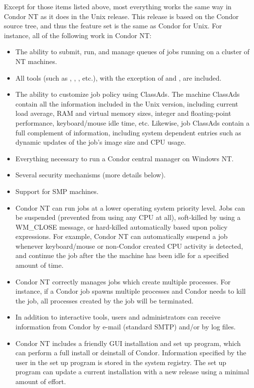 Except for those items listed above, most everything works
the same way in Condor NT as it does in the Unix release.
This release is based on the Condor \VersionNotice source tree, and thus the
feature set is the same as Condor \VersionNotice for Unix.  
For instance, all of the following work in Condor NT:
\begin{itemize}

\item The ability to submit, run, and manage queues of jobs running on a
cluster of NT machines.

\item All tools (such as , , ,
etc.), with the exception of  and , are 
included.

\item The ability to customize job policy using ClassAds.  The machine
ClassAds contain all the information included in the Unix version,
including current load average, RAM and virtual memory sizes, integer and
floating-point performance, keyboard/mouse idle time, etc.  Likewise, job
ClassAds contain a full complement of information, including system
dependent entries such as dynamic updates of the job's image size and CPU
usage.

\item Everything necessary to run a Condor central manager on Windows NT.

\item Several security mechanisms (more details below).

\item Support for SMP machines.

\item Condor NT can run jobs at a lower operating system priority level.
Jobs can be suspended (prevented from using any CPU at all), soft-killed 
by using 
a WM\_CLOSE message, or hard-killed automatically based upon policy
expressions.  For example, Condor NT can automatically suspend a job
whenever keyboard/mouse or non-Condor created CPU activity is detected, and
continue the job after the the machine has been idle for a specified amount
of time.

\item Condor NT correctly manages jobs which create multiple processes.  For
instance, if a Condor job spawns multiple processes and Condor
needs to kill the job,
all processes created by the job will be terminated.

\item In addition to interactive tools, users and administrators can receive
information from Condor by e-mail (standard SMTP) and/or by log files.

\item Condor NT includes a friendly GUI installation and set up program,
which can perform a full install or deinstall of Condor.
Information specified by the user in the set up program is stored in the
system registry.  
The set up program can update a current installation with a
new release using a minimal amount of effort.

\end{itemize}

